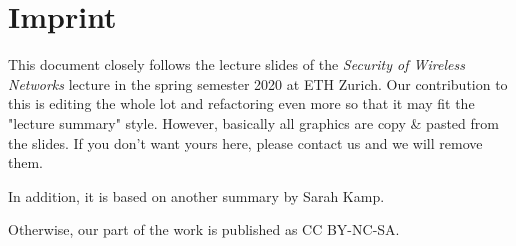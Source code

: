 %
%
\appendix


\section{Imprint}

This document closely follows the lecture slides of the \textit{Security of Wireless Networks} lecture in the spring semester 2020 at ETH Zurich.
Our contribution to this is editing the whole lot and refactoring even more so that it may fit the "lecture summary" style.
However, basically all graphics are copy \& pasted from the slides. If you don't want yours here, please contact us and we will remove them.

In addition, it is based on another summary by Sarah Kamp.

Otherwise, our part of the work is published as CC BY-NC-SA.



%
%